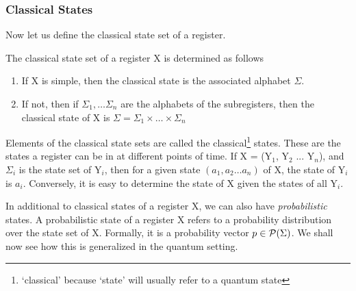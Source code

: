 \subsubsection{Classical States}
Now let us define the classical state set of a register.
\begin{definition}
The classical state set of a register \textsf{X} is determined as follows 
\begin{enumerate}
\item If \textsf{X} is simple, then the classical state is the associated alphabet $\Sigma$.
\item If not, then if $\Sigma_1,\dots \Sigma_n$ are the alphabets of the subregisters, then the classical state of \textsf{X} is $\Sigma = \Sigma_1 \times \dots \times \Sigma_n$
\end{enumerate}
\end{definition}\noindent
Elements of the classical state sets are called the classical\footnote{`classical' because `state' will usually refer to a quantum state} states. These are the states a register can be in at different points of time. If \textsf{X} = (\textsf{Y}$_1$, \textsf{Y}$_2$ ... \textsf{Y}$_n$), and $\Sigma_i$ is the state set of \textsf{Y}$_i$, then for a given state $(a_1,a_2 \dots a_n)$ of \textsf{X}, the state of \textsf{Y}$_i$ is $a_i$. Conversely, it is easy to determine the state of \textsf{X} given the states of all \textsf{Y}$_i$.

\noindent In additional to classical states of a register \textsf{X}, we can also have \textit{probabilistic} states. A probabilistic state of a register \textsf{X} refers to a probability distribution over the state set of \textsf{X}. Formally, it is a probability vector $p\in\P(\Sigma)$. We shall now see how this is generalized in the quantum setting.
